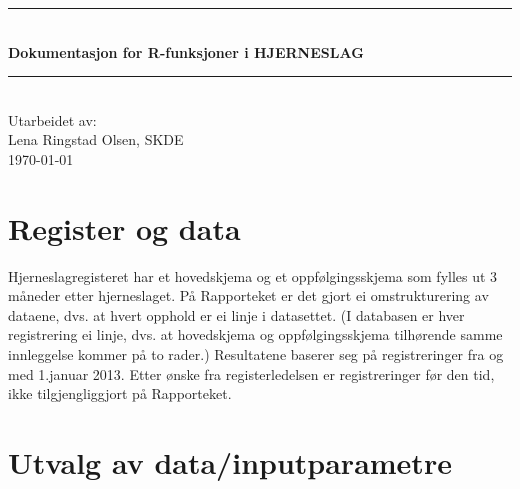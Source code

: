 \documentclass [norsk,a4paper,twoside]{article}
\begin{document}
\begin{titlepage}
\newcommand{\HRule}{\rule{\linewidth}{0.5mm}} %
\center %
\HRule \\[0.4cm]
{ \huge \bfseries Dokumentasjon for R-funksjoner i HJERNESLAG}\\[0.4cm] %
\HRule \\[1.5cm]
 
\Large Utarbeidet av: \\
\huge{Lena Ringstad Olsen, SKDE}\\[3cm] %

{\Large \today}\\[2cm] %

\vspace{5cm}

 
 \vfill %
\end{titlepage}


\section{Register og data}
Hjerneslagregisteret har et hovedskjema og et oppfølgingsskjema som fylles ut 3 måneder etter hjerneslaget. På Rapporteket er det gjort ei omstrukturering av dataene, dvs. at hvert opphold er ei linje i datasettet. (I databasen er hver registrering ei linje, dvs. at hovedskjema og oppfølgingsskjema tilhørende samme innleggelse kommer på to rader.)
Resultatene baserer seg på registreringer fra og med 1.januar 2013. Etter ønske fra registerledelsen er registreringer før den tid, ikke tilgjengliggjort på Rapporteket.

\section{Utvalg av data/inputparametre}
\end{document}
